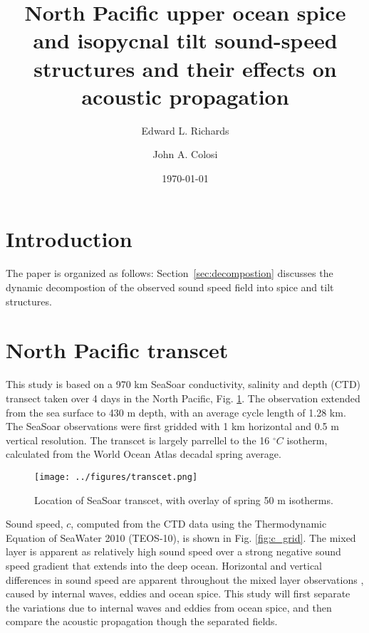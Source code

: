 \documentclass[preprint,NumberedRefs]{JASA}
\begin{document}
\title[Mixed layer tilt and spice]{North Pacific upper ocean spice and isopycnal tilt sound-speed structures and their effects on acoustic propagation}
\author{Edward L. Richards}
\author{John A. Colosi}


\date{\today}


\begin{abstract}

\end{abstract}

\maketitle

\section{\label{sec:intro} Introduction}

The paper is organized as follows: Section~\ref{sec:decompostion} discusses the dynamic decompostion of the observed sound speed field into spice and tilt structures.

\section{North Pacific transcet}
This study is based on a 970 km SeaSoar conductivity, salinity and depth (CTD) transect taken over 4 days in the North Pacific\citep{cole2010seasonal}, Fig. \ref{fig:transcet}. The observation extended from the sea surface to 430 m depth, with an average cycle length of 1.28 km. The SeaSoar observations were first gridded with 1 km horizontal and 0.5 m vertical resolution. The transcet is largely parrellel to the 16 $^\circ C$ isotherm, calculated from the World Ocean Atlas decadal spring average.

\begin{figure}
\texttt{[image: ../figures/transcet.png]}
    \caption{\label{fig:transcet}{Location of SeaSoar transcet, with overlay of spring 50 m isotherms.}}
\end{figure}


Sound speed, $c$, computed from the CTD data using the Thermodynamic Equation of SeaWater 2010 (TEOS-10), is shown in Fig. \ref{fig:c_grid}. The mixed layer is apparent as relatively high sound speed over a strong negative sound speed gradient that extends into the deep ocean. Horizontal and vertical differences in sound speed are apparent throughout the mixed layer observations \citep{colosi2020observations}, caused by internal waves, eddies and ocean spice. This study will first separate the variations due to internal waves and eddies from ocean spice, and then compare the acoustic propagation though the separated fields.
\end{document}
